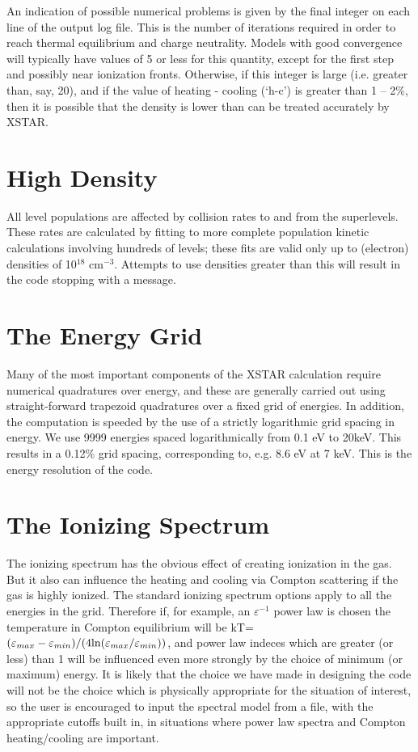 An indication of possible numerical problems is given by the final 
integer on each line of the output log file.  This is the number of 
iterations required in order to reach thermal equilibrium and charge 
neutrality.  Models with good convergence will typically have values 
of 5 or less for this quantity, except for the first step and possibly 
near ionization fronts.  Otherwise, if this integer is large 
(i.e. greater than, say, 20), and if the value of heating - cooling 
(`h-c') is greater than
1 -- 2$\%$, then it is possible that the density is lower than can be 
treated accurately by XSTAR.



\section{High Density}

All level populations are affected by collision rates to and from the 
superlevels.  These rates are calculated by fitting to more complete 
population kinetic calculations involving hundreds of levels; these 
fits are valid only up to (electron) densities of 10$^{18}$ cm$^{-3}$.
Attempts to use densities greater than this will result in the 
code stopping with a message.

\section{The Energy Grid}

Many of the most important components of the XSTAR calculation require 
numerical quadratures over energy, and these are generally carried out 
using straight-forward trapezoid quadratures over a fixed grid of 
energies.  In addition, the computation is speeded by the use of 
a strictly logarithmic grid spacing in energy.  We use 9999 energies 
spaced logarithmically from 0.1 eV to 20keV.  This results in a 0.12$\%$
grid spacing, corresponding to, e.g. 8.6 eV at 7 keV.  This is the 
energy resolution of the code.

\section{The Ionizing Spectrum}

The ionizing spectrum has the obvious effect of creating ionization in 
the gas.  But it also can influence the heating and cooling via Compton 
scattering if the gas is highly ionized.  The standard ionizing spectrum 
options apply to all the energies in the grid.  Therefore if, for example,
an $\varepsilon^{-1}$ power law is chosen the temperature in Compton 
equilibrium will be kT=$(\varepsilon_{max}-\varepsilon_{min})
/(4 {\rm ln}(\varepsilon_{max}/\varepsilon_{min}))$, and 
power law indeces which are greater (or less) than 1 will be influenced
even more strongly by the choice of minimum (or maximum) energy.
It is likely that the choice we have made in designing the code 
will not be the choice which is physically appropriate for the 
situation of interest, so the user is encouraged to input the spectral
model from a file, with the appropriate cutoffs built in, 
in situations where power law spectra and Compton heating/cooling
are important.

